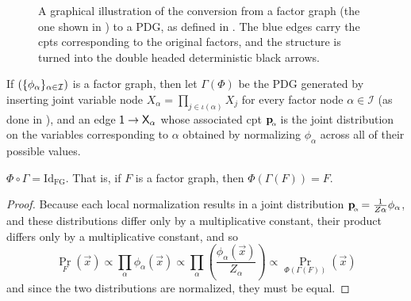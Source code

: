 \documentclass{article}
\newcommand{\bp}[1][L]{\mat{p}_{\!_#1\!}}
\numberwithin{equation}{section}
\begin{document}
\begin{figure}[h]
{}
		
		\caption{A graphical illustration of the conversion from a factor graph (the one shown in ) to a PDG, as defined in . The blue edges carry the cpts corresponding to the original factors, and the structure is turned into the double headed deterministic black arrows.}
		\label{fig:fg2PDG}
	\end{figure}
	
	\begin{defn} \label{def:fg2PDG}
		If $(\{\phi_\alpha\}_{\alpha \in \cal I})$ is a factor graph, then let $\Gamma(\Phi)$ be the PDG generated by inserting joint variable node $X_\alpha = \prod_{j \in \iota(\alpha)} X_j$ for every factor node $\alpha \in \mathcal I$ (as done in ), and an edge $\sf 1 \to X_\alpha$ whose associated cpt $\bp[\alpha]$ is the joint distribution on the variables corresponding to $\alpha$ obtained by normalizing $\phi_\alpha$ across all of their possible values.%
	\end{defn}

	\begin{prop}
		$\Phi \circ \Gamma = \mathrm{Id}_{\text{FG}}$. That is, if $F$ is a factor graph, then $\Phi(\Gamma(F)) = F$.
	\end{prop}
	\begin{proof}
		Because each local normalization results in a joint
                distribution $\bp[\alpha] = \frac{1}{Z\alpha}
                \phi_\alpha$, and these distributions differ
                only by a multiplicative 
               constant, their product differs only by a
                multiplicative constant, and so 
		\[ \Pr_F(\vec x) \propto \prod_\alpha \phi_\alpha(\vec x) \propto \prod_\alpha \left(\frac{\phi_\alpha(\vec x)}{Z_\alpha}\right) \propto \Pr_{\Phi(\Gamma(F))}(\vec x) \]
		and since the two distributions are normalized, they must be equal.
	\end{proof}
	
\end{document}
